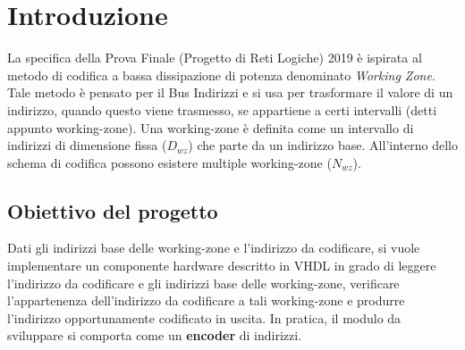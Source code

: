 \section{Introduzione}
La specifica della Prova Finale (Progetto di Reti Logiche) 2019 è ispirata al metodo di codifica a bassa dissipazione di potenza denominato \textit{Working Zone}.\newline
Tale metodo è pensato per il Bus Indirizzi e si usa per trasformare il valore di un indirizzo, quando questo viene trasmesso, se appartiene a certi intervalli (detti appunto working-zone). Una working-zone è definita come un intervallo di indirizzi di dimensione fissa ($D_{wz}$) che parte da un indirizzo base. All'interno dello schema di codifica possono esistere multiple working-zone ($N_{wz}$).

\subsection{Obiettivo del progetto}
Dati gli indirizzi base delle working-zone e l'indirizzo da codificare, si vuole implementare un componente hardware descritto in VHDL in grado di leggere l'indirizzo da codificare e gli indirizzi base delle working-zone, verificare l'appartenenza dell'indirizzo da codificare a tali working-zone e produrre l'indirizzo opportunamente codificato in uscita.
In pratica, il modulo da sviluppare si comporta come un \textbf{encoder} di indirizzi.

